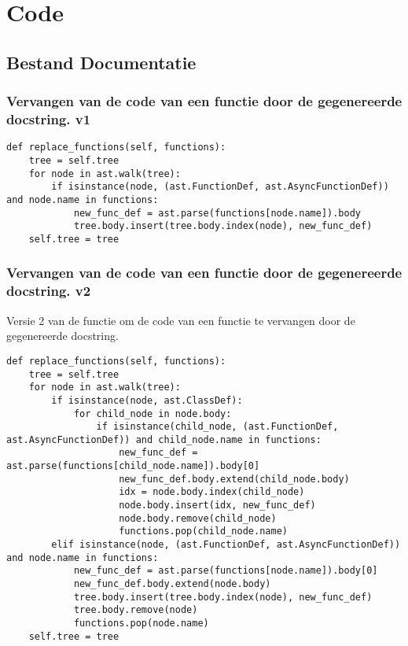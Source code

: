 \section{Code}
\label{bijlage:code}

\subsection{Bestand Documentatie}
\label{bijlage:documentatie-bestand}

\subsubsection{Vervangen van de code van een functie door de gegenereerde docstring. v1}
\label{bijlage:vervangen-v1}
\begin{verbatim}
def replace_functions(self, functions):
    tree = self.tree
    for node in ast.walk(tree):
        if isinstance(node, (ast.FunctionDef, ast.AsyncFunctionDef)) and node.name in functions:
            new_func_def = ast.parse(functions[node.name]).body
            tree.body.insert(tree.body.index(node), new_func_def)        
    self.tree = tree
\end{verbatim}

\subsubsection{Vervangen van de code van een functie door de gegenereerde docstring. v2}
\label{bijlage:vervangen-v2}
Versie 2 van de functie om de code van een functie te vervangen door de gegenereerde docstring.
\begin{verbatim}
def replace_functions(self, functions):
    tree = self.tree
    for node in ast.walk(tree):
        if isinstance(node, ast.ClassDef):
            for child_node in node.body:
                if isinstance(child_node, (ast.FunctionDef, ast.AsyncFunctionDef)) and child_node.name in functions:
                    new_func_def = ast.parse(functions[child_node.name]).body[0]
                    new_func_def.body.extend(child_node.body)
                    idx = node.body.index(child_node)
                    node.body.insert(idx, new_func_def)
                    node.body.remove(child_node)
                    functions.pop(child_node.name)
        elif isinstance(node, (ast.FunctionDef, ast.AsyncFunctionDef)) and node.name in functions:
            new_func_def = ast.parse(functions[node.name]).body[0]
            new_func_def.body.extend(node.body)
            tree.body.insert(tree.body.index(node), new_func_def)
            tree.body.remove(node)
            functions.pop(node.name)
    self.tree = tree
\end{verbatim}

